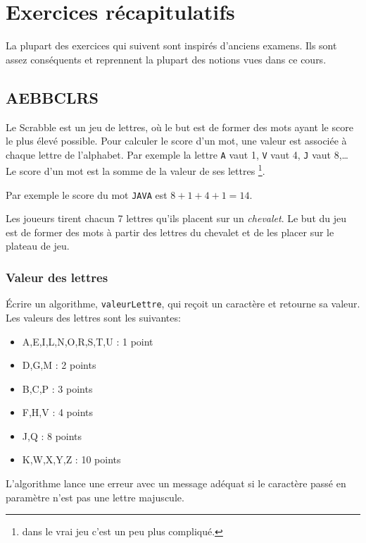 \chapter{Exercices récapitulatifs}

	La plupart des exercices qui suivent sont inspirés
	d'anciens examens.
	Ils sont assez conséquents et reprennent
	la plupart des notions vues dans ce cours.

	\section{AEBBCLRS}

		Le Scrabble est un jeu de lettres, 
		où le but est de former des mots ayant le score le plus élevé possible.
		Pour calculer le score d'un mot, 
		une valeur est associée à chaque lettre de l'alphabet. 
		Par exemple la lettre \texttt{A} vaut 1, \texttt{V} vaut 4, 
		\texttt{J} vaut 8,\dots{}
		Le score d'un mot est la somme de la valeur de ses lettres%
		\footnote{dans le vrai jeu c'est un peu plus compliqué.}.

		Par exemple le score du mot \texttt{JAVA} est $8+1+4+1 = 14$.

		Les joueurs tirent chacun 7 lettres qu'ils placent sur un \emph{chevalet}.
		Le but du jeu est de former des mots à partir des lettres du chevalet et de les placer sur le plateau de jeu.
	
		\subsection*{Valeur des lettres}
	
			\'Ecrire un algorithme, \texttt{valeurLettre}, 
			qui reçoit un caractère et retourne sa valeur. 
			Les valeurs des lettres sont les suivantes: 
			\begin{itemize}
			\item A,E,I,L,N,O,R,S,T,U : 1 point
			\item D,G,M : 2 points
			\item B,C,P : 3 points
			\item F,H,V : 4 points
			\item J,Q : 8 points
			\item K,W,X,Y,Z : 10 points
			\end{itemize}	

			L'algorithme lance une erreur avec un message adéquat 
			si le caractère passé en paramètre n'est pas une lettre majuscule.  
	
